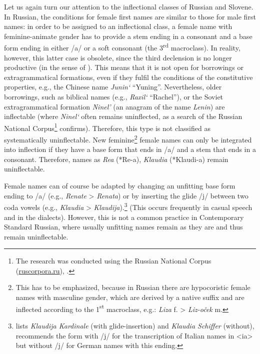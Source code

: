 \documentclass[output=paper]{langscibook}
\begin{document}
Let us again turn our attention to the inflectional classes of Russian and Slovene. In Russian, the conditions for female first names are similar to those for male first names: in order to be assigned to an inflectional class, a female name with feminine-animate gender has to provide a stem ending in a consonant and a base form ending in either /a/ or a soft consonant (the 3\textsuperscript{rd} macroclass). In reality, however, this latter case is obsolete, since the third declension is no longer productive (in the sense of \citealt{Dressler1997,Dressler2003}). This means that it is not open for borrowings or extragrammatical formations, even if they fulfil the conditions of the constitutive properties, e.g., the Chinese name \textit{Junin‘} “Yuning”. Nevertheless, older borrowings, such as biblical names (e.g., \textit{Raxil‘} “Rachel”), or the Soviet extragrammatical formation \textit{Ninel’} (an anagram of the name \textit{Lenin}) are inflectable (where \textit{Ninel‘} often remains uninflected, as a search of the Russian National Corpus\footnote{ \textrm{The research was conducted using the Russian National Corpus (}\href{https://ruscorpora.ru/}{{\textrm{ruscorpora.ru}}}\textrm{), \citealt{SavčukEtAl2024}.}} confirms). Therefore, this type is not classified as systematically uninflectable. New feminine\footnote{ \textrm{This has to be emphasized, because in Russian there are hypocoristic female names with masculine gender, which are derived by a native suffix and are inflected according to the 1}\textrm{\textsuperscript{st}} \textrm{macroclass, e.g.:} \textrm{\textit{Liza}} \textrm{f. >} \textrm{\textit{Liz-oček}} \textrm{m.}} female names can only be integrated into inflection if they have a base form that ends in /a/ and a stem that ends in a consonant. Therefore, names as \textit{Rea} (*Re-a), \textit{Klaudia} (*Klaudi-a) remain uninflectable. 

Female names can of course be adapted by changing an unfitting base form ending to /a/ (e.g., \textit{Renate} > \textit{Renata}) or by inserting the glide /j/ between two coda vowels (e.g., \textit{Klaudia} > \textit{Klaudija}).\footnote{\textrm{\citet{Ageenko2010} lists} \textrm{\textit{Klaudija Kardinale}} \textrm{(with glide-insertion) and} \textrm{\textit{Klaudia Schiffer}} \textrm{(without), \citet{Klyšinskij2010} recommends the form with /j/ for the transcription of Italian names in <ia> but without /j/ for German names with this ending.}} (This occurs frequently in casual speech and in the dialects). However, this is not a common practice in Contemporary Standard Russian, where usually unfitting names remain as they are and thus remain uninflectable.
\end{document}
